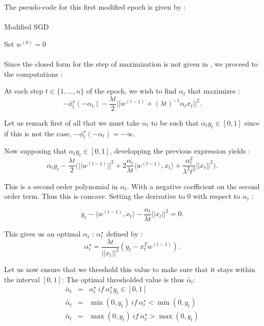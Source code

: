 \documentclass[10pt,a4paper]{article}
\begin{document}
The pseudo-code for this first modified epoch is given by : 

\paragraph{}
\begin{algorithm}[H]
\caption{Modified SGD}
\SetAlgoLined
Set $w^{(0)} = 0$\;
\end{algorithm}



\paragraph{}
Since the closed form for the step of maximization is not given in \cite{1}, we proceed to the computations : 

At each step $t \in \{1,..., n \}$ of the epoch, we wish to find $\alpha_t$ that maximizes : 
$$ - \phi_t^{\star}(-\alpha_t) - \frac{\lambda t}{2} ||w^{(t-1)} + (\lambda t)^{-1} \alpha_t x_t ||^2.$$

Let us remark first of all that we must take $\alpha_t$ to be such that $\alpha_t y_t \in [0, 1]$ since if this is not the case, $- \phi_t^{\star}(-\alpha_t) = - \infty$. 

Now supposing that $\alpha_t y_t \in [0, 1]$, developping the previous expression yields : 
$$ \alpha_t y_t - \frac{\lambda t}{2} \Big ( ||w^{(t-1)}||^2 + 2 \frac{\alpha_t}{\lambda t} \langle w^{(t-1)}, x_t \rangle + \frac{\alpha_t^2}{\lambda^2 t^2}||x_t||^2 \Big).$$

This is a second order polynomial in $\alpha_t$. With a negative coefficient on the second order term. Thus this is concave. Setting the derivative to 0 with respect to $\alpha_t$ : 

$$ y_t - \langle w^{(t-1)}, x_t \rangle - \frac{\alpha_t}{\lambda t}||x_t||^2  = 0.$$


This gives us an optimal $\alpha_t$ : $\alpha_t^{\star}$ defined by :  
$$ \alpha_t^{\star} = \frac{\lambda t}{||x_t||^2} (y_t - x_t^T w^{(t-1)}).$$

Let us now ensure that we threshold this value to make sure that it stays within the interval $[0, 1]$: The optimal thresholded value is thus $\tilde{\alpha_t}$:
\begin{eqnarray*}
    \tilde{\alpha_t} &=& \alpha_t^{\star} ~if~\alpha_t^{\star} y_t \in [0, 1] \\
    \tilde{\alpha_t} &=& \min(0, y_t)~if~\alpha_t^{\star} < \min(0, y_t)\\
    \tilde{\alpha_t} &=& \max(0, y_t)~if~\alpha_t^{\star} > \max(0, y_t)\\
\end{eqnarray*}
\end{document}
